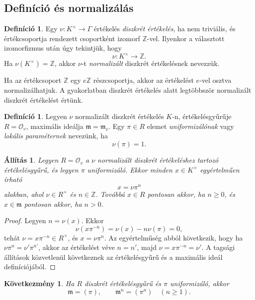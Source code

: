 \documentclass[11pt,a4paper]{article}
\newtheorem{allitas}[tetel]{Állítás}
\newtheorem{kovetkezmeny}[tetel]{Következmény}
\theoremstyle{definition}
\newtheorem{definicio}[tetel]{Definíció}
\newcommand{\OO}{\mathcal O}
\newcommand{\mm}{\mathfrak m}
\newcommand{\ZZ}{\mathbb Z}
\begin{document}
\subsection{Definíció és normalizálás}

\begin{definicio}
Egy $
\nu:K^\times\to\Gamma$ értékelés \emph{diszkrét értékelés}, ha
nem triviális, és értékcsoportja rendezett csoportként izomorf
$\ZZ$-vel. Ilyenkor a választott izomorfizmus után úgy tekintjük, hogy
\[
  
\nu:K^\times\longrightarrow \ZZ.
\]
Ha $
\nu(K^\times)=\ZZ$, akkor $
\nu$-t \emph{normalizált} diszkrét
értékelésnek nevezzük.
\end{definicio}

Ha az értékcsoport $\ZZ$ egy $e\ZZ$ részcsoportja, akkor az értékelést
$e$-vel osztva normalizálhatjuk. A gyakorlatban diszkrét értékelés
alatt legtöbbször normalizált diszkrét értékelést értünk.

\begin{definicio}
Legyen $
\nu$ normalizált diszkrét értékelés $K$-n, értékelésgyűrűje
$R=\OO_v$, maximális ideálja $\mm=\mm_v$. Egy $\pi\in R$ elemet
\emph{uniformizálónak} vagy \emph{lokális paraméternek} nevezünk, ha
\[
  
\nu(\pi)=1.
\]
\end{definicio}

\begin{allitas}
Legyen $R=\OO_v$ a $
\nu$ normalizált diszkrét értékeléshez tartozó
értékelésgyűrű, és legyen
$\pi$ uniformizáló. Ekkor minden $x\in K^\times$ egyértelműen írható
\[
  x=\nu\pi^n
\]
alakban, ahol $\nu\in R^\times$ és $n\in\ZZ$. Továbbá $x\in R$ pontosan
akkor, ha $n\geq 0$, és $x\in\mm$ pontosan akkor, ha $n>0$.
\end{allitas}

\begin{proof}
Legyen $n=
\nu(x)$. Ekkor
\[
  
\nu(x\pi^{-n})=
\nu(x)-n 
\nu(\pi)=0,
\]
tehát $\nu=x\pi^{-n}\in R^\times$, és $x=\nu\pi^n$. Az egyértelműség
abból következik, hogy ha $\nu\pi^n=\nu'\pi^{n'}$, akkor az értékelést
véve $n=n'$, majd $\nu=x\pi^{-n}=\nu'$. A tagsági állítások közvetlenül következnek
az értékelésgyűrű és a maximális ideál definíciójából.
\end{proof}

\begin{kovetkezmeny}
Ha $R$ diszkrét értékelésgyűrű és $\pi$ uniformizáló, akkor
\[
  \mm=(\pi),
  \qquad
  \mm^n=(\pi^n)\quad (n\geq 1).
\]
\end{kovetkezmeny}
\end{document}
